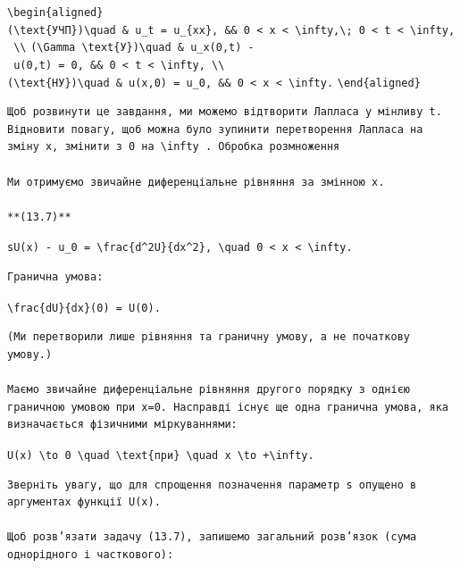 \documentclass[
  ukrainian,
]{article}
\begin{document}
\texttt{\textbackslash{}begin\{aligned\}}
\texttt{(\textbackslash{}text\{УЧП\})\textbackslash{}quad\ \&\ u\_t\ =\ u\_\{xx\},\ \&\&\ 0\ \textless{}\ x\ \textless{}\ \textbackslash{}infty,\textbackslash{};\ 0\ \textless{}\ t\ \textless{}\ \textbackslash{}infty,\ \textbackslash{}\textbackslash{}}
\texttt{(\textbackslash{}Gamma\ \textbackslash{}text\{У\})\textbackslash{}quad\ \&\ u\_x(0,t)\ -\ u(0,t)\ =\ 0,\ \&\&\ 0\ \textless{}\ t\ \textless{}\ \textbackslash{}infty,\ \textbackslash{}\textbackslash{}}
\texttt{(\textbackslash{}text\{НУ\})\textbackslash{}quad\ \&\ u(x,0)\ =\ u\_0,\ \&\&\ 0\ \textless{}\ x\ \textless{}\ \textbackslash{}infty.}
\texttt{\textbackslash{}end\{aligned\}}

\begin{verbatim}
Щоб розвинути це завдання, ми можемо відтворити Лапласа у мінливу t. Відновити повагу, щоб можна було зупинити перетворення Лапласа на зміну x, змінити з 0 на \infty . Обробка розмноження

Ми отримуємо звичайне диференціальне рівняння за змінною x.

**(13.7)**
\end{verbatim}

\texttt{sU(x)\ -\ u\_0\ =\ \textbackslash{}frac\{d\^{}2U\}\{dx\^{}2\},\ \textbackslash{}quad\ 0\ \textless{}\ x\ \textless{}\ \textbackslash{}infty.}

\begin{verbatim}
Гранична умова:
\end{verbatim}

\texttt{\textbackslash{}frac\{dU\}\{dx\}(0)\ =\ U(0).}

\begin{verbatim}
(Ми перетворили лише рівняння та граничну умову, а не початкову умову.)

Маємо звичайне диференціальне рівняння другого порядку з однією граничною умовою при x=0. Насправді існує ще одна гранична умова, яка визначається фізичними міркуваннями:
\end{verbatim}

\texttt{U(x)\ \textbackslash{}to\ 0\ \textbackslash{}quad\ \textbackslash{}text\{при\}\ \textbackslash{}quad\ x\ \textbackslash{}to\ +\textbackslash{}infty.}

\begin{verbatim}
Зверніть увагу, що для спрощення позначення параметр s опущено в аргументах функції U(x).

Щоб розв’язати задачу (13.7), запишемо загальний розв’язок (сума однорідного і часткового):
\end{verbatim}
\end{document}
